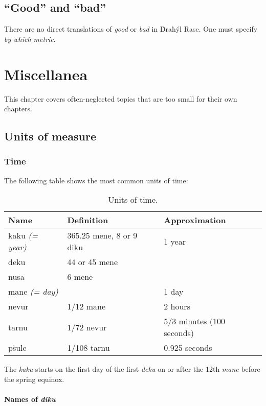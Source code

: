 \documentclass{book}
\begin{document}
\section{``Good'' and ``bad''}

There are no direct translations of \emph{good} or \emph{bad} in Ḋraħýl Rase. One must specify \emph{by which metric}.

\chapter{Miscellanea}

This chapter covers often-neglected topics that are too small for their own chapters.

\section{Units of measure}

\subsection{Time}

The following table shows the most common units of time:

\begin{table}[h]
    \caption{Units of time.}
    \centering
    \begin{tabu} to \linewidth {|l|X|X|}
        \hline
        Name & Definition & Approximation \\
        \hline
        kaku \emph{(= year)} & 365.25 mene, 8 or 9 diku & 1 year \\
        deku & 44 or 45 mene & \\
        nusa & 6 mene & \\
        mane \emph{(= day)} & & 1 day \\
        nevur & 1/12 mane & 2 hours \\
        tarnu & 1/72 nevur & 5/3 minutes (100 seconds) \\
        pṡule & 1/108 tarnu & 0.925 seconds \\
        \hline
    \end{tabu}
\end{table}

The \emph{kaku} starts on the first day of the first \emph{deku} on or after the 12th \emph{mane} before the spring equinox.

\newpage
\subsubsection{Names of \emph{diku}}
\end{document}
